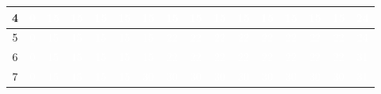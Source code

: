 \documentclass{article}
\begin{document}
\begin{center}
\begin{tabular}{|c|c|c|c|c|c|c|c|c|c|c|c|c|c|c|c|}
4 & \cellcolor{rojo}\textcolor{white}{0} & \cellcolor{verde}\textcolor{white}{15} & \cellcolor{rojo}\textcolor{white}{15} & \cellcolor{rojo}\textcolor{white}{15} & \cellcolor{rojo}\textcolor{white}{15} & \cellcolor{rojo}\textcolor{white}{15} & \cellcolor{rojo}\textcolor{white}{15} & \cellcolor{rojo}\textcolor{white}{15} & \cellcolor{rojo}\textcolor{white}{15} & \cellcolor{rojo}\textcolor{white}{15} & \cellcolor{rojo}\textcolor{white}{15} & \cellcolor{rojo}\textcolor{white}{15} & \cellcolor{rojo}\textcolor{white}{15} & \cellcolor{rojo}\textcolor{white}{15} & \cellcolor{verde}\textcolor{white}{24} \\ \hline
5 & \cellcolor{rojo}\textcolor{white}{0} & \cellcolor{verde}\textcolor{white}{15} & \cellcolor{rojo}\textcolor{white}{15} & \cellcolor{rojo}\textcolor{white}{15} & \cellcolor{rojo}\textcolor{white}{15} & \cellcolor{rojo}\textcolor{white}{15} & \cellcolor{verde}\textcolor{white}{22} & \cellcolor{rojo}\textcolor{white}{22} & \cellcolor{rojo}\textcolor{white}{22} & \cellcolor{rojo}\textcolor{white}{22} & \cellcolor{rojo}\textcolor{white}{22} & \cellcolor{rojo}\textcolor{white}{22} & \cellcolor{rojo}\textcolor{white}{22} & \cellcolor{rojo}\textcolor{white}{22} & \cellcolor{verde}\textcolor{white}{24} \\ \hline
6 & \cellcolor{rojo}\textcolor{white}{0} & \cellcolor{verde}\textcolor{white}{15} & \cellcolor{rojo}\textcolor{white}{15} & \cellcolor{rojo}\textcolor{white}{15} & \cellcolor{rojo}\textcolor{white}{15} & \cellcolor{rojo}\textcolor{white}{15} & \cellcolor{verde}\textcolor{white}{22} & \cellcolor{rojo}\textcolor{white}{22} & \cellcolor{rojo}\textcolor{white}{22} & \cellcolor{rojo}\textcolor{white}{22} & \cellcolor{rojo}\textcolor{white}{22} & \cellcolor{rojo}\textcolor{white}{22} & \cellcolor{rojo}\textcolor{white}{22} & \cellcolor{rojo}\textcolor{white}{22} & \cellcolor{verde}\textcolor{white}{31} \\ \hline
7 & \cellcolor{rojo}\textcolor{white}{0} & \cellcolor{verde}\textcolor{white}{15} & \cellcolor{rojo}\textcolor{white}{15} & \cellcolor{rojo}\textcolor{white}{15} & \cellcolor{rojo}\textcolor{white}{15} & \cellcolor{verde}\textcolor{white}{30} & \cellcolor{rojo}\textcolor{white}{30} & \cellcolor{rojo}\textcolor{white}{30} & \cellcolor{rojo}\textcolor{white}{30} & \cellcolor{rojo}\textcolor{white}{30} & \cellcolor{rojo}\textcolor{white}{30} & \cellcolor{rojo}\textcolor{white}{30} & \cellcolor{rojo}\textcolor{white}{30} & \cellcolor{rojo}\textcolor{white}{30} & \cellcolor{verde}\textcolor{white}{31} \\ \hline

\end{tabular}
\end{center}
\end{document}
